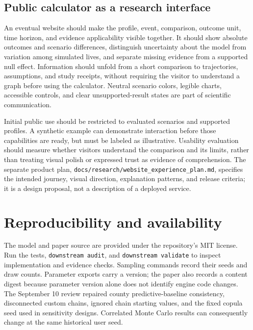 \documentclass[10pt]{article}
\begin{document}
\subsection{Public calculator as a research interface}
An eventual website should make the profile, event, comparison, outcome
unit, time horizon, and evidence applicability visible together. It should
show absolute outcomes and scenario differences, distinguish uncertainty
about the model from variation among simulated lives, and separate missing
evidence from a supported null effect. Information should unfold from a
short comparison to trajectories, assumptions, and study receipts, without
requiring the visitor to understand a graph before using the calculator.
Neutral scenario colors, legible charts, accessible controls, and clear
unsupported-result states are part of scientific communication.

Initial public use should be restricted to evaluated scenarios and supported
profiles. A synthetic example can demonstrate interaction before those
capabilities are ready, but must be labeled as illustrative. Usability
evaluation should measure whether visitors understand the comparison and
its limits, rather than treating visual polish or expressed trust as
evidence of comprehension. The separate product plan,
\nolinkurl{docs/research/website_experience_plan.md}, specifies the intended journey,
visual direction, explanation patterns, and release criteria; it is a
design proposal, not a description of a deployed service.

\section{Reproducibility and availability}
The model and paper source are provided under the repository's MIT
license. Run the tests, \texttt{downstream audit}, and
\texttt{downstream validate} to inspect implementation and evidence
checks. Sampling commands record their seeds and draw counts. Parameter
exports carry a version; the paper also records a content digest because
parameter version alone does not identify engine code changes. The
September 10 review repaired county predictive-baseline consistency,
disconnected custom chains, ignored chain starting values, and the
fixed copula seed used in sensitivity designs. Correlated Monte Carlo
results can consequently change at the same historical user seed.
\end{document}
